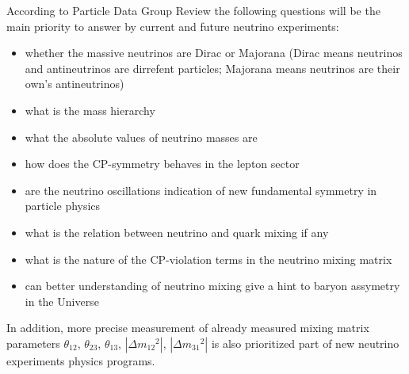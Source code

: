 
According to Particle Data Group Review \cite{ref_PDG} the following questions will be the main priority to answer by current and future neutrino experiments:
\begin{itemize}
  \item whether the massive neutrinos are Dirac or Majorana (Dirac means neutrinos and antineutrinos are dirrefent particles; Majorana means neutrinos are their own's antineutrinos)
  \item what is the mass hierarchy
  \item what the absolute values of neutrino masses are
  \item how does the CP-symmetry behaves in the lepton sector
  \item are the neutrino oscillations indication of new fundamental symmetry in particle physics
  \item what is the relation between neutrino and quark mixing if any
  \item what is the nature of the CP-violation terms in the neutrino mixing matrix
  \item can better understanding of neutrino mixing give a hint to baryon assymetry in the Universe 
\end{itemize} 
In addition, more precise measurement of already measured mixing matrix parameters $\theta_{12}$, $\theta_{23}$, $\theta_{13}$, $|\Delta{m_{12}}^2|$, $|\Delta{m_{31}}^2|$ is also prioritized part of new neutrino experiments physics programs.
